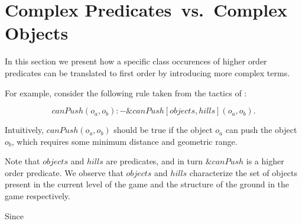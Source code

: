 \section{Complex Predicates~vs.~Complex Objects}
\label{sec:main}

In this section we present how a specific class occurences of higher order predicates can be translated to first order by introducing more complex terms.

For example, consider the following rule taken from the tactics of \ah:


$$ canPush(o_a,o_b) :- \&canPush[objects,hills](o_a,o_b). $$

Intuitively, $canPush(o_a, o_b)$ should be true if the object $o_a$ can push the object $o_b$, which requires some minimum distance and geometric range.

Note that $objects$ and $hills$ are predicates, and in turn $\&canPush$ is a higher order predicate. We observe that $objects$ and $hills$ characterize the set of objects present in the current level of the game and the structure of the ground in the game respectively.

Since 

